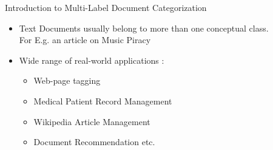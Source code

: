 \documentclass[10pt]{beamer}
\begin{document}
\begin{frame}{Introduction to Multi-Label Document Categorization}
\vfill{}
\vfill
{}
\begin{itemize}
	\vfill\item<1-> Text Documents usually belong to more than one conceptual class. \\For E.g. an article on Music Piracy 
	\vfill\item<1-> Wide range of real-world applications :
	\begin{itemize} 
	  \vfill\item<1-> Web-page tagging
	  \vfill\item<1-> Medical Patient Record Management
	  \vfill\item<1-> Wikipedia Article Management
	  \vfill\item<1-> Document Recommendation etc.
	\end{itemize} 
\end{itemize}
\vfill
\end{frame}

\end{document}
